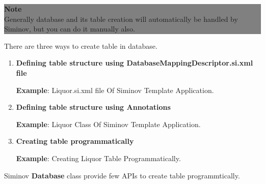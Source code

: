 			\begin{center}
				\colorbox{grey}{
				\parbox[t]{.8\linewidth}{
					\fontsize{11pt}{11pt}\selectfont %
					\vspace*{0.1cm} %

					\hfill \textbf{Note} \\
					Generally database and its table creation will automatically be handled by Siminov, but you can do it manually also.

					\vspace*{0.0cm} %
					}
			}

			\end{center}


		\par
		There are three ways to create table in database.

		\begin{enumerate}

			\item \small \textbf{Defining table structure using DatabaseMappingDescriptor.si.xml file}

				\textbf{Example}: Liquor.si.xml file Of Siminov Template Application.
				
		
			\item \small \textbf{Defining table structure using Annotations}

				\textbf{Example}: Liquor Class Of Siminov Template Application.
				

			\item \small \textbf{Creating table programmatically}

				\textbf{Example}: Creating Liquor Table Programmatically.
				

		\end{enumerate}


		\par
		 Siminov \textbf{Database} class provide few APIs to create table programmtically.

